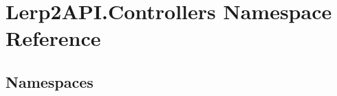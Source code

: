 \hypertarget{namespace_lerp2_a_p_i_1_1_controllers}{}\section{Lerp2\+A\+P\+I.\+Controllers Namespace Reference}
\label{namespace_lerp2_a_p_i_1_1_controllers}
\subsection*{Namespaces}
\begin{DoxyCompactItemize}
\end{DoxyCompactItemize}
